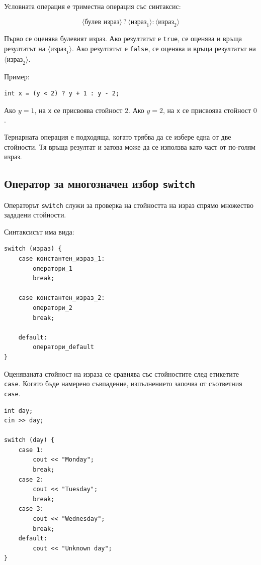 Условната операция е триместна операция със синтаксис:

\[
\langle\text{булев израз}\rangle
\mathrel{?}
\langle\text{израз}_1\rangle
:
\langle\text{израз}_2\rangle
\]

Първо се оценява булевият израз. Ако резултатът е \texttt{true}, се оценява и връща резултатът на $\langle\text{израз}_1\rangle$. Ако резултатът е \texttt{false}, се оценява и връща резултатът на $\langle\text{израз}_2\rangle$.

Пример:

\begin{verbatim}
int x = (y < 2) ? y + 1 : y - 2;
\end{verbatim}

Ако $y=1$, на \texttt{x} се присвоява стойност $2$. Ако $y=2$, на \texttt{x} се присвоява стойност $0$.

Тернарната операция е подходяща, когато трябва да се избере една от две стойности. Тя връща резултат и затова може да се използва като част от по-голям израз.

\subsection{Оператор за многозначен избор \texttt{switch}}\label{s:14.3.3}

Операторът \texttt{switch} служи за проверка на стойността на израз спрямо множество зададени стойности.

Синтаксисът има вида:

\begin{verbatim}
switch (израз) {
    case константен_израз_1:
        оператори_1
        break;

    case константен_израз_2:
        оператори_2
        break;

    default:
        оператори_default
}
\end{verbatim}

Оценяваната стойност на израза се сравнява със стойностите след етикетите \texttt{case}. Когато бъде намерено съвпадение, изпълнението започва от съответния \texttt{case}.

\begin{example}
\begin{verbatim}
int day;
cin >> day;

switch (day) {
    case 1:
        cout << "Monday";
        break;
    case 2:
        cout << "Tuesday";
        break;
    case 3:
        cout << "Wednesday";
        break;
    default:
        cout << "Unknown day";
}
\end{verbatim}
\end{example}

